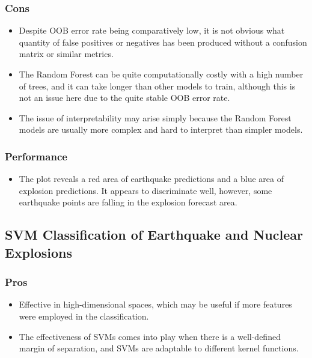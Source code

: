 \documentclass[
]{article}
\providecommand{\tightlist}{%
  \setlength{\itemsep}{0pt}\setlength{\parskip}{0pt}}
\begin{document}
\subsubsection{Cons}\label{cons}

\begin{itemize}
\tightlist
\item
  Despite OOB error rate being comparatively low, it is not obvious what
  quantity of false positives or negatives has been produced without a
  confusion matrix or similar metrics.
\item
  The Random Forest can be quite computationally costly with a high
  number of trees, and it can take longer than other models to train,
  although this is not an issue here due to the quite stable OOB error
  rate.
\item
  The issue of interpretability may arise simply because the Random
  Forest models are usually more complex and hard to interpret than
  simpler models.
\end{itemize}

\subsubsection{Performance}\label{performance}

\begin{itemize}
\tightlist
\item
  The plot reveals a red area of earthquake predictions and a blue area
  of explosion predictions. It appears to discriminate well, however,
  some earthquake points are falling in the explosion forecast area.
\end{itemize}

\subsection{SVM Classification of Earthquake and Nuclear
Explosions}\label{svm-classification-of-earthquake-and-nuclear-explosions}

\subsubsection{Pros}\label{pros-1}

\begin{itemize}
\tightlist
\item
  Effective in high-dimensional spaces, which may be useful if more
  features were employed in the classification.
\item
  The effectiveness of SVMs comes into play when there is a well-defined
  margin of separation, and SVMs are adaptable to different kernel
  functions.
\end{itemize}
\end{document}
